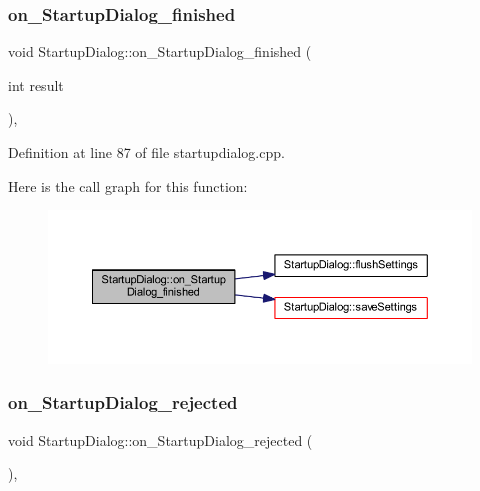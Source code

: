 \subsubsection{\texorpdfstring{on\_StartupDialog\_finished}{on\_StartupDialog\_finished}}
{\footnotesize\ttfamily void Startup\+Dialog\+::on\+\_\+\+Startup\+Dialog\+\_\+finished (\begin{DoxyParamCaption}\item[{int}]{result }\end{DoxyParamCaption})\hspace{0.3cm}{\ttfamily [private]}, {\ttfamily [slot]}}



Definition at line 87 of file startupdialog.\+cpp.

Here is the call graph for this function\+:
\nopagebreak
\begin{figure}[H]
\begin{center}
\leavevmode
\includegraphics[width=350pt]{class_startup_dialog_a5d6aa20d81bc223b2e9931811b2aca95_cgraph}
\end{center}
\end{figure}
\mbox{\label{class_startup_dialog_a49bcc6d2a28e82654ab583aba08f0ba5}} 
\subsubsection{\texorpdfstring{on\_StartupDialog\_rejected}{on\_StartupDialog\_rejected}}
{\footnotesize\ttfamily void Startup\+Dialog\+::on\+\_\+\+Startup\+Dialog\+\_\+rejected (\begin{DoxyParamCaption}{ }\end{DoxyParamCaption})\hspace{0.3cm}{\ttfamily [private]}, {\ttfamily [slot]}}



